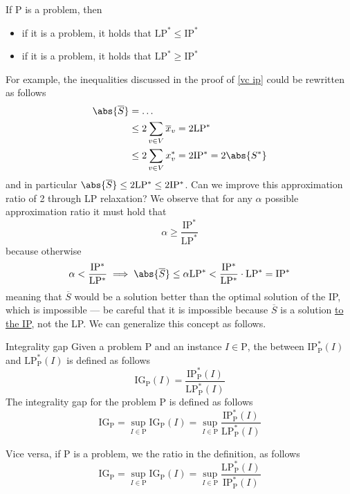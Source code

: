 \documentclass[a4paper, 12pt]{report}
\begin{document}
    \begin{framedprop}[label={ig bounds}]{}
        If P is a problem, then

        \begin{itemize}
            \item if it is a  problem, it holds that $\mathrm{LP}^* \le \mathrm{IP}^*$
            \item if it is a  problem, it holds that $\mathrm{LP}^* \ge \mathrm{IP}^*$
        \end{itemize}
    \end{framedprop}

    For example, the inequalities discussed in the proof of \cref{vc ip} could be rewritten as follows
    \begin{equation*}
        \begin{split}
            \abs{\overline S} &= \ldots \\
                              &\le 2 \sum_{v \in V}{\overline x_v} = 2 \mathrm{LP^*} \\
                              &\le 2 \sum_{v \in V}{x^*_v} = 2 \mathrm{IP^*} = 2 \abs{S^*}\\
        \end{split}
    \end{equation*}
    and in particular $\abs{\overline S} \le 2 \mathrm{LP^*} \le 2 \mathrm{IP^*}$. Can we improve this approximation ratio of 2 through LP relaxation? We observe that for any $\alpha$ possible approximation ratio it must hold that $$\alpha \ge \dfrac{\mathrm{IP^*}}{\mathrm{LP^*}}$$ because otherwise $$\alpha < \mathrm{\dfrac{IP^*}{LP^*}} \implies \abs{\overline S} \le \alpha \mathrm{LP^*} < \mathrm{\dfrac{IP^*}{LP^*}} \cdot \mathrm{LP^*} = \mathrm{IP^*}$$ meaning that $\overline S$ would be a solution better than the optimal solution of the IP, which is impossible --- be careful that it is impossible because $\overline S$ is a solution \underline{to the IP}, not the LP. We can generalize this concept as follows.

    \begin{frameddefn}{Integrality gap}
        Given a  problem P and an instance $I \in \mathrm P$, the  between $\mathrm{IP^*_P}(I)$ and $\mathrm{LP^*_P}(I)$ is defined as follows $$\mathrm{IG_P}(I) = \dfrac{\mathrm{IP^*_P}(I)}{\mathrm{LP^*_P}(I)}$$ The integrality gap for the problem P is defined as follows $$\mathrm{IG_P} = \sup_{I \in \mathrm P}{\mathrm{IG_P}(I)} = \sup_{I \in \mathrm P}{\dfrac{\mathrm{IP^*_P}(I)}{\mathrm{LP^*_P}(I)}}$$

        Vice versa, if P is a  problem, we  the ratio in the definition, as follows $$\mathrm{IG_P} = \sup_{I \in \mathrm P}{\mathrm{IG_P}(I)} = \sup_{I \in \mathrm P}{\dfrac{\mathrm{LP^*_P}(I)}{\mathrm{IP^*_P}(I)}}$$
    \end{frameddefn}
\end{document}
